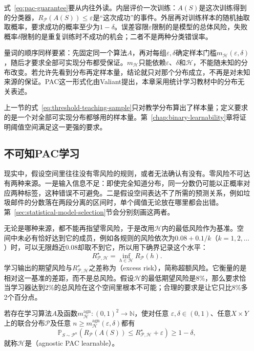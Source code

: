 式~\eqref{eq:pac-guarantee}要从内往外读。内层评价一次训练：$A(S)$是这次训练得到的分类器，$R_{\mathcal P}(A(S))\leq\varepsilon$是“这次成功”的事件。外层再对训练样本的随机抽取取概率，要求成功的概率至少为$1-\delta$。误差容限$\varepsilon$限制的是模型的总体风险，失败概率$\delta$限制的是重复训练时不成功的机会；二者不是两种分类错误率。

量词的顺序同样要紧：先固定同一个算法$A$，再对每组$\varepsilon,\delta$确定样本门槛$m_{\mathcal H}(\varepsilon,\delta)$，随后才要求全部可实现分布都受保证。$m_{\mathcal H}$只能依赖$\varepsilon$、$\delta$和$\mathcal H$，不能随未知的分布改变。若允许先看到分布再定样本量，结论就只对那个分布成立，不再是对未知来源的保证。PAC这一形式化由Valiant提出，本章采用统计学习教材中的分布无关表述。

上一节的式~\eqref{eq:threshold-teaching-sample}只对教学分布算出了样本量；定义要求的是一个对全部可实现分布都够用的样本量。第~\ref{chap:binary-learnability}章将证明阈值空间满足这一更强的要求。

\subsection{不可知PAC学习}
\label{sec:pac-agnostic}

现实中，假设空间里往往没有零风险的规则，或者无法确认有没有。零风险不可达有两种来源。一是输入信息不足：即使完全知道分布，同一分数仍可能以正概率对应两种标签，这种错误不可避免。二是假设空间表达不了所需的预测关系，例如垃圾邮件的分数落在两段分离的区间时，单个阈值无论放在哪里都会出错。第~\ref{sec:statistical-model-selection}节会分别刻画这两者。

无论是哪种来源，都不能再指望零风险，于是改用$\mathcal H$内的最低风险作为基准。空间中未必有恰好达到它的成员，例如各规则的风险依次为$0.08+0.1/k$（$k=1,2,\ldots$）时，可以无限趋近0.08却取不到它，所以用下确界记录这个水平：
\begin{equation}
 R_{\mathcal P,\mathcal H}^\star=\inf_{h\in\mathcal H}R_{\mathcal P}(h).
 \label{eq:best-in-class-risk}
\end{equation}
学习输出的期望风险与$R_{\mathcal P,\mathcal H}^\star$之差称为（excess risk），简称超额风险。它衡量的是相对这一基准的差距，而不是总风险。假设$\mathcal H$的最低期望风险是8\%，那么要求恰当学习器达到2\%的总风险在这个空间里根本不可能；合理的要求是让它只比8\%多2个百分点。

\begin{definition}[不可知PAC可学习]
\label{def:agnostic-pac}
若存在学习算法$A$及函数$m_{\mathcal H}^{\mathrm{agn}}:(0,1)^2\to\mathbb N$，使对任意
$\varepsilon,\delta\in(0,1)$、任意$X\times Y$上的联合分布$\mathcal P$及任意
$n\geq m_{\mathcal H}^{\mathrm{agn}}(\varepsilon,\delta)$都有
\begin{equation}
 \mathbb P_{S\sim\mathcal P^n}\left(
 R_{\mathcal P}(A(S))\leq R_{\mathcal P,\mathcal H}^\star+\varepsilon
 \right)\geq1-\delta,
 \label{eq:agnostic-pac-guarantee}
\end{equation}
就称$\mathcal H$是（agnostic PAC learnable）。
\end{definition}

